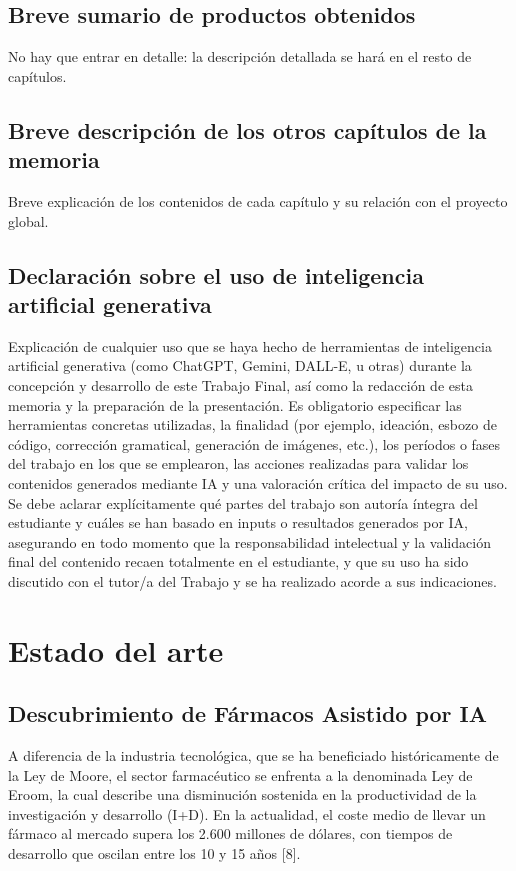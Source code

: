 \documentclass[IB]{TFUOC}%
\begin{document}
\section{Breve sumario de productos obtenidos}

No hay que entrar en detalle: la descripción detallada se hará en el resto de capítulos.
\section{Breve descripción de los otros capítulos de la memoria}

Breve explicación de los contenidos de cada capítulo y su relación con el proyecto global.
\section{Declaración sobre el uso de inteligencia artificial generativa}

Explicación de cualquier uso que se haya hecho de herramientas de inteligencia artificial generativa (como ChatGPT, Gemini, DALL-E, u otras) durante la concepción y desarrollo de este Trabajo Final, así como la redacción de esta memoria y la preparación de la presentación. Es obligatorio especificar las herramientas concretas utilizadas, la finalidad (por ejemplo, ideación, esbozo de código, corrección gramatical, generación de imágenes, etc.), los períodos o fases del trabajo en los que se emplearon, las acciones realizadas para validar los contenidos generados mediante IA y una valoración crítica del impacto de su uso. Se debe aclarar explícitamente qué partes del trabajo son autoría íntegra del estudiante y cuáles se han basado en inputs o resultados generados por IA, asegurando en todo momento que la responsabilidad intelectual y la validación final del contenido recaen totalmente en el estudiante, y que su uso ha sido discutido con el tutor/a del Trabajo y se ha realizado acorde a sus indicaciones. 


\chapter{Estado del arte}

\section{Descubrimiento de Fármacos Asistido por IA}

A diferencia de la industria tecnológica, que se ha beneficiado históricamente de la Ley de Moore, el sector farmacéutico se enfrenta a la denominada Ley de Eroom, la cual describe una disminución sostenida en la productividad de la investigación y desarrollo (I+D). En la actualidad, el coste medio de llevar un fármaco al mercado supera los 2.600 millones de dólares, con tiempos de desarrollo que oscilan entre los 10 y 15 años [8].
\end{document}
